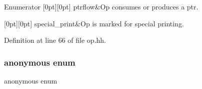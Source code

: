 \begin{DoxyEnumFields}{Enumerator}
[0pt][0pt]{}\mbox{\label{class_pcode_op_ad8230d20e6cd3905b8ec0bb6652eb91fa884e553cb8c57fad8356bd041c30a0c4}} 
ptrflow&Op consumes or produces a ptr. \\
\hline

[0pt][0pt]{}\mbox{\label{class_pcode_op_ad8230d20e6cd3905b8ec0bb6652eb91faace88e8f6d9076dbcb9f8f137469fb1d}} 
special\+\_\+print&Op is marked for special printing. \\
\hline

\end{DoxyEnumFields}


Definition at line 66 of file op.\+hh.

\mbox{\label{class_pcode_op_adf54b281171a722dd3395c142d42078e}} 
\subsubsection{\texorpdfstring{anonymous enum}{anonymous enum}}
{\footnotesize\ttfamily anonymous enum}

